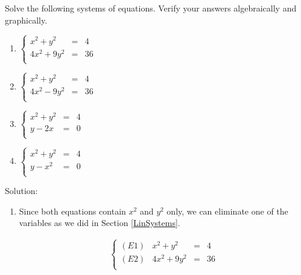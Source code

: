 \begin{ex}  \label{nonlinearex1} Solve the following systems of equations.  Verify your answers algebraically and graphically.

\begin{multicols}{2}

\begin{enumerate}

\item  $\left\{\begin{array}{rcr}  x^2 +y^2 & = & 4 \\ 4x^2+9y^2 & = & 36 \\ \end{array} \right.$

\item  $\left\{\begin{array}{rcr}  x^2 +y^2 & = & 4 \\ 4x^2-9y^2 & = & 36 \\ \end{array} \right.$

\item  $\left\{\begin{array}{rcr}  x^2 +y^2 & = & 4 \\ y - 2x & = & 0 \\ \end{array} \right.$

\item  $\left\{\begin{array}{rcr}  x^2 +y^2 & = & 4 \\ y  - x^2 & = & 0 \\ \end{array} \right.$

\end{enumerate}

\end{multicols}

{\sc Solution:}

\begin{enumerate}

\item  Since both equations contain $x^2$ and $y^2$ only, we can eliminate one of the variables as we did in Section \ref{LinSystems}.

\[ \begin{array}{ccc}

\left\{\begin{array}{lrcr} (E1) & x^2 +y^2 & = & 4 \\ (E2) & 4x^2+9y^2 & = & 36 \\ \end{array} \right.


\end{array}\]
\end{enumerate}
\end{ex}
